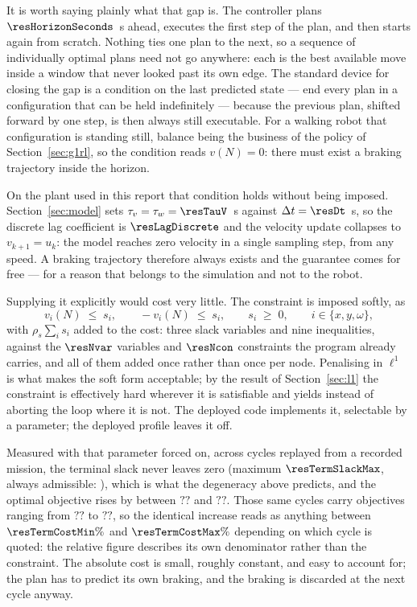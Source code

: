 \documentclass[11pt,a4paper]{article}
\providecommand{\resTermAbsMin}{\textbf{??}}
\providecommand{\resTermAbsMax}{\textbf{??}}
\providecommand{\resTermJMin}{\textbf{??}}
\providecommand{\resTermJMax}{\textbf{??}}
\begin{document}
It is worth saying plainly what that gap is. The controller plans $\resHorizonSeconds$~s ahead, executes the
first step of the plan, and then starts again from scratch. Nothing ties one plan to the next, so a sequence
of individually optimal plans need not go anywhere: each is the best available move inside a window that
never looked past its own edge. The standard device for closing the gap is a condition on the last predicted
state --- end every plan in a configuration that can be held indefinitely --- because the previous plan,
shifted forward by one step, is then always still executable. For a walking robot that configuration is
standing still, balance being the business of the policy of Section~\ref{sec:g1rl}, so the condition reads
$v(N)=0$: there must exist a braking trajectory inside the horizon.

On the plant used in this report that condition holds without being imposed. Section~\ref{sec:model} sets
$\tau_v=\tau_w=\resTauV$~s against $\Delta t=\resDt$~s, so the discrete lag coefficient is $\resLagDiscrete$
and the velocity update collapses to $v_{k+1}=u_k$: the model reaches zero velocity in a single sampling
step, from any speed. A braking trajectory therefore always exists and the guarantee comes for free --- for
a reason that belongs to the simulation and not to the robot.

Supplying it explicitly would cost very little. The constraint is imposed softly, as
\begin{equation}
  v_i(N)\;\le\;s_i,\qquad -v_i(N)\;\le\;s_i,\qquad s_i\;\ge\;0,\qquad i\in\{x,y,\omega\},
  \label{eq:terminal}
\end{equation}
with $\rho_s\sum_i s_i$ added to the cost: three slack variables and nine inequalities, against the
$\resNvar$ variables and $\resNcon$ constraints the program already carries, and all of them added once
rather than once per node. Penalising in $\ell^1$ is what makes the soft form acceptable; by the result
of Section~\ref{sec:l1} the constraint is effectively hard wherever it is satisfiable and yields instead of
aborting the loop where it is not. The deployed code implements it, selectable by a parameter; the deployed
profile leaves it off.

Measured with that parameter forced on, across cycles replayed from a recorded mission, the terminal slack
never leaves zero (maximum $\resTermSlackMax$, always admissible: \resTermFeasible), which is what the
degeneracy above predicts, and the optimal objective rises by between $\resTermAbsMin$ and $\resTermAbsMax$.
Those same cycles carry objectives ranging from $\resTermJMin$ to $\resTermJMax$, so the identical increase
reads as anything between $\resTermCostMin\%$ and $\resTermCostMax\%$ depending on which cycle is quoted:
the relative figure describes its own denominator rather than the constraint. The absolute cost is small,
roughly constant, and easy to account for; the plan has to predict its own braking, and the braking is
discarded at the next cycle anyway.
\end{document}
